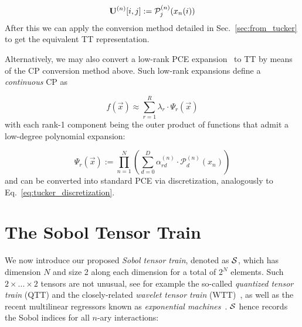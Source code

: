 \documentclass[review, twocolumn]{svjour3}          %
\begin{document}
\begin{equation}
\label{eq:tucker_discretization}
\mathbf{U}^{(n)}[i, j] := \mathcal{P}^{(n)}_j(x_n(i))
\end{equation}
After this we can apply the conversion method detailed in Sec.~\ref{sec:from_tucker} to get the equivalent TT representation.

Alternatively, we may also convert a low-rank PCE expansion~\cite{KS:16} to TT by means of the CP conversion method above.
Such low-rank expansions define a \emph{continuous} CP as

\begin{equation}
f(\vec{x}) \approx \sum_{r=1}^R \lambda_r \cdot \Psi_r(\vec{x})
\end{equation}
%
with each rank-1 component being the outer product of functions that admit a low-degree polynomial expansion:

\begin{equation}
\Psi_r(\vec{x}) := \prod_{n=1}^N \left( \sum_{d=0}^D \alpha^{(n)}_{rd} \cdot \mathcal{P}^{(n)}_d(x_n) \right)
\end{equation}
%
and can be converted into standard PCE via discretization, analogously to Eq.~\ref{eq:tucker_discretization}.


\section{The Sobol Tensor Train} \label{sec:global}



We now introduce our proposed \emph{Sobol tensor train}, denoted as $\mathcal{S}$, which has dimension $N$ and size 2 along each dimension for a total of $2^N$ elements. Such $2 \times ... \times 2$ tensors are not unusual, see for example the so-called \emph{quantized tensor train} (QTT) and the closely-related \emph{wavelet tensor train} (WTT)~\cite{OT:11}, as well as the recent multilinear regressors known as \emph{exponential machines}~\cite{NTO:16}. $\mathcal{S}$ hence records the Sobol indices for all $n$-ary interactions:
\end{document}
